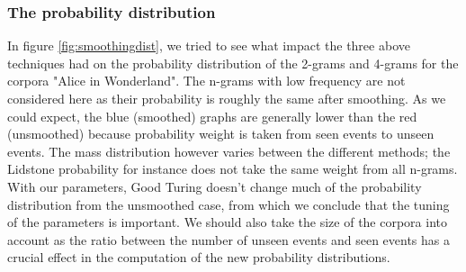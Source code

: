 \documentclass[a4paper,12pt]{article}
\begin{document}
\subsubsection{The probability distribution}
	In figure \ref{fig:smoothingdist}, we tried to see what impact the three above techniques had on the probability distribution of the 2-grams and 4-grams for the corpora "Alice in Wonderland". The n-grams with low frequency are not considered here as their probability is roughly the same after smoothing. As we could expect, the blue (smoothed) graphs are generally lower than the red (unsmoothed) because probability weight is taken from seen events to unseen events. The mass distribution however varies between the different methods; the Lidstone probability for instance does not take the same weight from all n-grams. With our parameters, Good Turing doesn't change much of the probability distribution from the unsmoothed case, from which we conclude that the tuning of the parameters is important. We should also take the size of the corpora into account as the ratio between the number of unseen events and seen events has a crucial effect in the computation of the new probability distributions.
\end{document}
